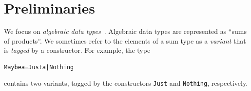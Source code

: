 \documentclass[10pt]{sigplanconf}
\newenvironment{code}{\begin{alltt}\small}{\end{alltt}}
\newcommand{\ttp}[1]{\texttt{#1}}
\begin{document}


\section{Preliminaries}\label{sec:preliminaries}



We focus on \emph{algebraic data types}~\cite{}.  Algebraic data types are
represented as ``sums of products''.  We sometimes refer to the elements of a
sum type as a \emph{variant} that is \emph{tagged} by a constructor.  For
example, the type
%
\begin{code}
Maybe a = Just a | Nothing
\end{code}
%
\noindent
contains two variants, tagged by the constructors \ttp{Just} and \ttp{Nothing},
respectively.
\end{document}
